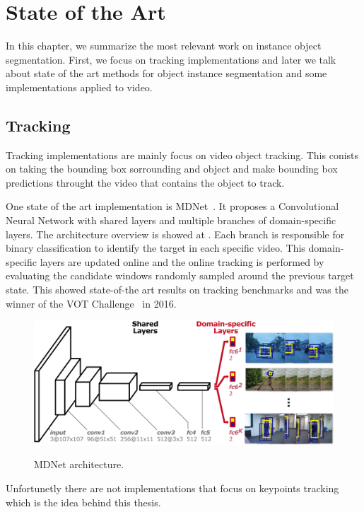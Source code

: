 
\chapter{State of the Art}
\label{cha:stateofart}

In this chapter, we summarize the most relevant work on instance object segmentation.
First, we focus on tracking implementations and later we talk about state of the art methods for object instance segmentation and some implementations applied to video.

\section{Tracking}
\label{sec:soa_tracking}

Tracking implementations are mainly focus on video object tracking.
This conists on taking the bounding box sorrounding and object and make bounding box predictions throught the video that contains the object to track.

One state of the art implementation is MDNet~\cite{nam2016learning}.
It proposes a Convolutional Neural Network with shared layers and multiple branches of domain-specific layers.
The architecture overview is showed at .
Each branch is responsible for binary classification to identify the target in each specific video.
This domain-specific layers are updated online and the online tracking is performed by evaluating the candidate windows randomly sampled around the previous target state.
This showed state-of-the art results on tracking benchmarks and was the winner of the VOT Challenge~\cite{VOT_TPAMI} in 2016.

\begin{figure}[h]
  \centering
  \includegraphics[width=.8\linewidth]{figures/mdnet/architecture.png}
  \label{fig:mdnet}
  \caption{MDNet architecture. }
\end{figure}

Unfortunetly there are not implementations that focus on keypoints tracking which is the idea behind this thesis.

